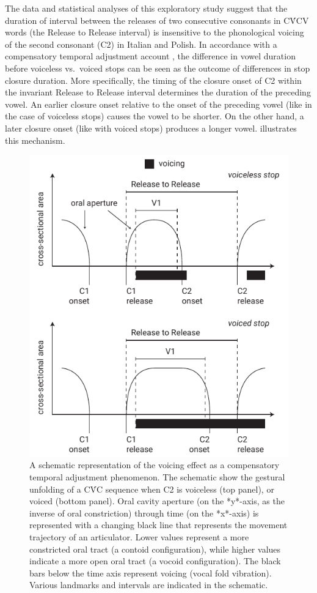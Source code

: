 \documentclass[preprint]{JASAnew}
\begin{document}
The data and statistical analyses of this exploratory study suggest that
the duration of interval between the releases of two consecutive
consonants in CV́CV words (the Release to Release interval) is
insensitive to the phonological voicing of the second consonant (C2) in
Italian and Polish. In accordance with a compensatory temporal
adjustment account \citep{slis1969, lehiste1970}, the difference in
vowel duration before voiceless vs.~voiced stops can be seen as the
outcome of differences in stop closure duration. More specifically, the
timing of the closure onset of C2 within the invariant Release to
Release interval determines the duration of the preceding vowel. An
earlier closure onset relative to the onset of the preceding vowel (like
in the case of voiceless stops) causes the vowel to be shorter. On the
other hand, a later closure onset (like with voiced stops) produces a
longer vowel.  illustrates this mechanism.

\begin{figure}
  \includegraphics{img/compensatory.pdf}
  \caption{A schematic representation of the voicing effect as a compensatory temporal adjustment phenomenon. The schematic show the gestural unfolding of a CV́C sequence when C2 is voiceless (top panel), or voiced (bottom panel). Oral cavity aperture (on the *y*-axis, as the inverse of oral constriction) through time (on the *x*-axis) is represented with a changing black line that represents the movement trajectory of an articulator. Lower values represent a more constricted oral tract (a contoid configuration), while higher values indicate a more open oral tract (a vocoid configuration). The black bars below the time axis represent voicing (vocal fold vibration). Various landmarks and intervals are indicated in the schematic.}
  \label{f:compensatory}
\end{figure}
\end{document}
